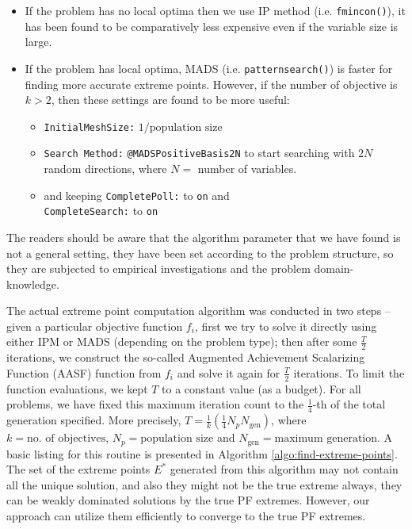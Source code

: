 \documentclass[journal]{IEEEtran}
\begin{document}
%
\begin{itemize}
	\item If the problem has no local optima then we use IP method (i.e. \texttt{fmincon()}), it has been found to be comparatively less expensive even if the variable size is large.
	\item If the problem has local optima, MADS (i.e. \texttt{patternsearch()}) is faster for finding more accurate extreme points. However, if the number of objective is $k > 2$, then these settings are found to be more useful:
		\begin{itemize}
			\item \texttt{InitialMeshSize:} \(1/\text{population size}\)
			\item \texttt{Search Method:} \texttt{@MADSPositiveBasis2N} to start searching with $2N$ random directions, where $N =$ number of variables.
			\item and keeping \texttt{CompletePoll:} to \texttt{on} and\\ \texttt{CompleteSearch:} to \texttt{on}
		\end{itemize}
\end{itemize}
%
The readers should be aware that the algorithm parameter that we have found is not a general setting, they have been set according to the problem structure, so they are subjected to empirical investigations and the problem domain-knowledge. 

The actual extreme point computation algorithm was conducted in two steps -- given a particular objective function \(f_i\), first we try to solve it directly using either IPM or MADS (depending on the problem type); then after some \(\frac{T}{2}\) iterations, we construct the so-called Augmented Achievement Scalarizing Function (AASF) function from \(f_i\) and solve it again for \(\frac{T}{2}\) iterations. To limit the function evaluations, we kept \(T\) to a constant value (as a budget). For all problems, we have fixed this maximum iteration count to the \(\frac{1}{4}\)-th of the total generation specified. More precisely, $T = \frac{1}{k}(\frac{1}{4}N_p N_{\text{gen}})$, where $k = \text{no. of objectives}$, $N_p = \text{population size}$ and $N_{\text{gen}} = \text{maximum generation}$. A basic listing for this routine is presented in Algorithm \ref{algo:find-extreme-points}. The set of the extreme points \(E^\ast\) generated from this algorithm may not contain all the unique solution, and also they might not be the true extreme always, they can be weakly dominated solutions by the true PF extremes. However, our approach can utilize them efficiently to converge to the true PF extremes.
\end{document}
